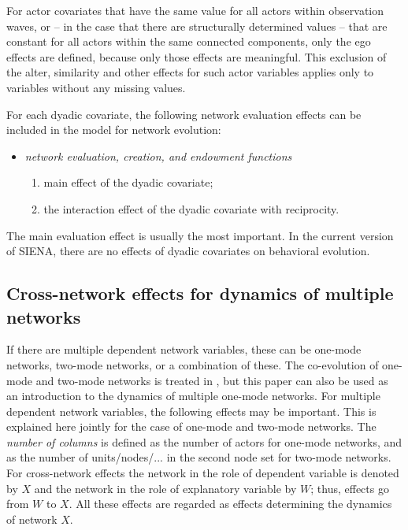 \documentclass[a4paper,fleqn,11pt]{article}
\newcommand{\+}{\, + \,}
\newcommand{\si}{{\sf SIENA}}
\begin{document}
For actor covariates that have the same value for all actors within observation
waves,
or -- in the case that there are structurally determined values --
that are constant for all actors within the same connected components,
only the ego effects are defined, because only those
effects are meaningful.
This exclusion of the alter, similarity and other effects for
such actor variables applies only to variables without any missing values.

For each dyadic covariate, the following network evaluation effects
can be included in the model for network evolution:
\begin{itemize}
\item {\em network evaluation, creation, and endowment functions}
\begin{enumerate}
\item main effect of the dyadic covariate;
\item the interaction effect of the dyadic covariate with reciprocity.
\end{enumerate}
\end{itemize}
The main evaluation effect is usually the most important. In the
current version of \si, there are no effects of dyadic covariates
on behavioral evolution.

\subsection{Cross-network effects for dynamics of multiple networks}


If there are multiple dependent network variables, these can be
one-mode networks, two-mode networks, or a combination of these.
The co-evolution of one-mode and two-mode networks is treated in
\citet{SLT2012}, but this paper can also be used as an introduction
to the dynamics of multiple one-mode networks.
For multiple dependent network variables,
the following effects may be important.
This is explained here jointly for the case of one-mode and two-mode
networks. The \emph{number of columns} is defined as the number of actors
for one-mode networks, and as the number of units/nodes/...
in the second node set for two-mode networks.
For cross-network effects the network in the role of dependent variable
is denoted by $X$ and the network in the role of explanatory variable
by $W$; thus, effects go from $W$ to $X$.
All these effects are regarded as effects determining the dynamics of network $X$.
\end{document}
